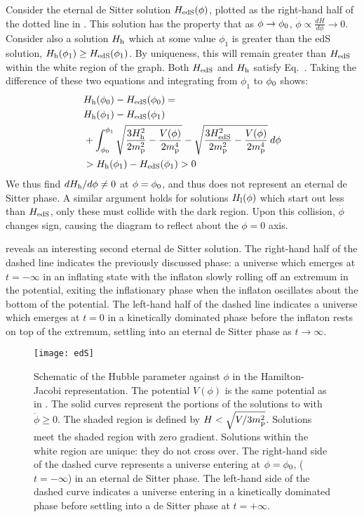 Consider the eternal de Sitter solution $H_\mathrm{edS}(\phi)$, plotted
as the right-hand half of the dotted line in .
This solution has the property that as $\phi\to\phi_0$,
$\dot{\phi}\propto\frac{dH}{d\phi}\to0$. Consider also a solution
$H_\mathrm{h}$ which at some value $\phi_1$ is greater than the edS solution,
$H_\mathrm{h}(\phi_1) \ge H_\mathrm{edS}(\phi_1)$. By uniqueness, this will remain
greater than $H_\mathrm{edS}$ within the white region of the graph. Both
$H_\mathrm{edS}$ and $H_\mathrm{h}$ satisfy Eq.\ .
Taking the difference of these two equations and integrating from
$\phi_1$ to $\phi_0$ shows:
%
\begin{align}
  &H_\mathrm{h}(\phi_0)-H_\mathrm{edS}(\phi_0)= \nonumber\\
  &H_\mathrm{h}(\phi_1)-H_\mathrm{edS}(\phi_1) \nonumber\\
  & + \int_{\phi_0}^{\phi_1} 
  \sqrt{\frac{3H_\mathrm{h}^2}{2m_{\mathrm{p}}^2} - 
  \frac{V(\phi)}{2m_{\mathrm{p}}^4}}-\sqrt{\frac{3H_\mathrm{edS}^2}{2m_{\mathrm{p}}^2} - 
  \frac{V(\phi)}{2m_{\mathrm{p}}^4}}\:d\phi \nonumber \\
  &>H_\mathrm{h}(\phi_1)-H_\mathrm{edS}(\phi_1)>0 \nonumber
\end{align}
%
We thus find ${dH_\mathrm{h}}/{d\phi}\ne0$ at $\phi=\phi_0$, and thus does not
represent an eternal de Sitter phase. A similar argument holds for
solutions $H_\mathrm{l}(\phi)$ which start out less than $H_\mathrm{edS}$, only these
must collide with the dark region. Upon this collision, $\dot{\phi}$
changes sign, causing the diagram to reflect about the $\phi=0$ axis.

 reveals an interesting second eternal de Sitter
solution. The right-hand half of the dashed line indicates the
previously discussed phase: a universe which emerges at $t=-\infty$ in
an inflating state with the inflaton slowly rolling off an extremum in
the potential, exiting the inflationary phase when the inflaton
oscillates about the bottom of the potential.  The left-hand half of
the dashed line indicates a universe which emerges at $t=0$ in a
kinetically dominated phase before the inflaton rests on top of the
extremum, settling into an eternal de Sitter phase as $t\to\infty$.

%
\begin{figure}
  \texttt{[image: edS]}
  \caption{Schematic of the Hubble parameter against $\phi$ in the
    Hamilton-Jacobi representation. The potential $V(\phi)$ is the
    same potential as in
    \protect{}. The solid curves
    represent the portions of the solutions to
    \protect{} with $\dot{\phi}\ge0$. The
    shaded region is defined by $H<\sqrt{V/3m_{\mathrm{p}}^2}$. Solutions meet the
    shaded region with zero gradient. Solutions within the white
    region are unique: they do not cross over. The right-hand side of
    the dashed curve represents a universe entering at  $\phi=\phi_0$,
    ($t=-\infty$) in an eternal de Sitter phase. The left-hand side of
    the dashed curve indicates a universe entering in a kinetically
    dominated phase before settling into a de Sitter phase at
    $t=+\infty$.
  }
  \label{fig:figure_edS}
\end{figure}
%

